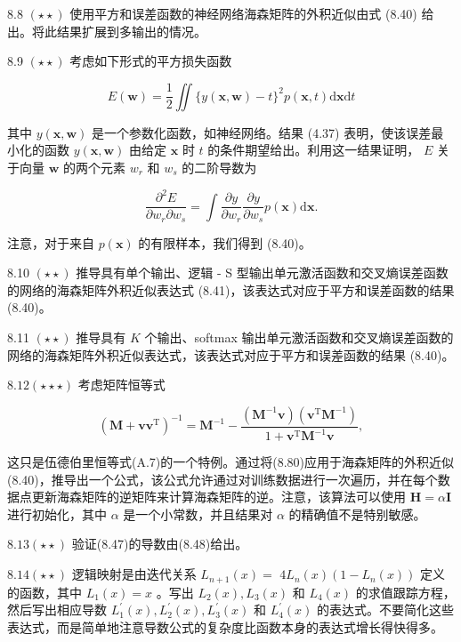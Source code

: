 \documentclass[10pt]{report}
\begin{document}
8.8 \(\left( {\star  \star  }\right)\) 使用平方和误差函数的神经网络海森矩阵的外积近似由式 (8.40) 给出。将此结果扩展到多输出的情况。

8.9 \(\left( {\star  \star  }\right)\) 考虑如下形式的平方损失函数

\[
E\left( \mathbf{w}\right)  = \frac{1}{2}\iint \{ y\left( {\mathbf{x},\mathbf{w}}\right)  - t{\} }^{2}p\left( {\mathbf{x},t}\right) \mathrm{d}\mathbf{x}\mathrm{d}t \tag{8.78}
\]

其中 \(y\left( {\mathbf{x},\mathbf{w}}\right)\) 是一个参数化函数，如神经网络。结果 (4.37) 表明，使该误差最小化的函数 \(y\left( {\mathbf{x},\mathbf{w}}\right)\) 由给定 \(\mathbf{x}\) 时 \(t\) 的条件期望给出。利用这一结果证明， \(E\) 关于向量 \(\mathbf{w}\) 的两个元素 \({w}_{r}\) 和 \({w}_{s}\) 的二阶导数为

\[
\frac{{\partial }^{2}E}{\partial {w}_{r}\partial {w}_{s}} = \int \frac{\partial y}{\partial {w}_{r}}\frac{\partial y}{\partial {w}_{s}}p\left( \mathbf{x}\right) \mathrm{d}\mathbf{x}. \tag{8.79}
\]

注意，对于来自 \(p\left( \mathbf{x}\right)\) 的有限样本，我们得到 (8.40)。

8.10 \(\left( {\star  \star  }\right)\) 推导具有单个输出、逻辑 - S 型输出单元激活函数和交叉熵误差函数的网络的海森矩阵外积近似表达式 (8.41)，该表达式对应于平方和误差函数的结果 (8.40)。

8.11 \(\left( {\star  \star  }\right)\) 推导具有 \(K\) 个输出、softmax 输出单元激活函数和交叉熵误差函数的网络的海森矩阵外积近似表达式，该表达式对应于平方和误差函数的结果 (8.40)。

\({8.12}\left( {\star  \star   \star  }\right)\) 考虑矩阵恒等式

\[
{\left( \mathbf{M} + \mathbf{v}{\mathbf{v}}^{\mathrm{T}}\right) }^{-1} = {\mathbf{M}}^{-1} - \frac{\left( {{\mathbf{M}}^{-1}\mathbf{v}}\right) \left( {{\mathbf{v}}^{\mathrm{T}}{\mathbf{M}}^{-1}}\right) }{1 + {\mathbf{v}}^{\mathrm{T}}{\mathbf{M}}^{-1}\mathbf{v}}, \tag{8.80}
\]

这只是伍德伯里恒等式(A.7)的一个特例。通过将(8.80)应用于海森矩阵的外积近似(8.40)，推导出一个公式，该公式允许通过对训练数据进行一次遍历，并在每个数据点更新海森矩阵的逆矩阵来计算海森矩阵的逆。注意，该算法可以使用 \(\mathbf{H} = \alpha \mathbf{I}\) 进行初始化，其中 \(\alpha\) 是一个小常数，并且结果对 \(\alpha\) 的精确值不是特别敏感。

\({8.13}\left( {\star  \star  }\right)\) 验证(8.47)的导数由(8.48)给出。

\({8.14}\left( {\star  \star  }\right)\) 逻辑映射是由迭代关系 \({L}_{n + 1}\left( x\right)  =\)  \(4{L}_{n}\left( x\right) \left( {1 - {L}_{n}\left( x\right) }\right)\) 定义的函数，其中 \({L}_{1}\left( x\right)  = x\) 。写出 \({L}_{2}\left( x\right) ,{L}_{3}\left( x\right)\) 和 \({L}_{4}\left( x\right)\) 的求值跟踪方程，然后写出相应导数 \({L}_{1}^{\prime }\left( x\right) ,{L}_{2}^{\prime }\left( x\right) ,{L}_{3}^{\prime }\left( x\right)\) 和 \({L}_{4}^{\prime }\left( x\right)\) 的表达式。不要简化这些表达式，而是简单地注意导数公式的复杂度比函数本身的表达式增长得快得多。
\end{document}
